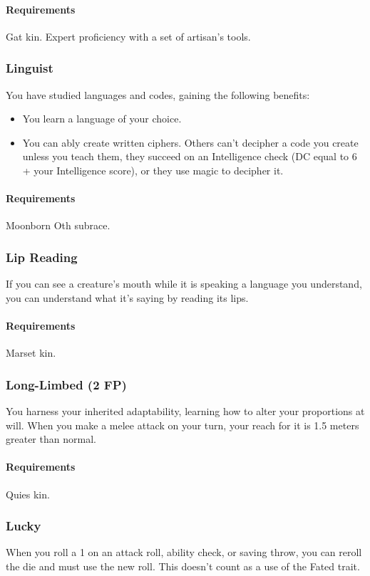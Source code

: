     \paragraph{Requirements} Gat kin. Expert proficiency with a set of artisan's tools.
\subsubsection{Linguist} \label{feat::linguist}
    You have studied languages and codes, gaining the following benefits:
    \begin{itemize}
        \item You learn a language of your choice.
        \item You can ably create written ciphers.
        Others can't decipher a code you create unless you teach them, they succeed on an Intelligence check (DC equal to 6 + your Intelligence score), or they use magic to decipher it. %
    \end{itemize}
    \paragraph{Requirements} Moonborn Oth subrace.
\subsubsection{Lip Reading} \label{feat::lipreading}
    If you can see a creature's mouth while it is speaking a language you understand, you can understand what it's saying by reading its lips.
    \paragraph{Requirements} Marset kin.
\subsubsection{Long-Limbed (2 FP)} \label{feat::longlimbed}
    You harness your inherited adaptability, learning how to alter your proportions at will.
    When you make a melee attack on your turn, your reach for it is 1.5 meters greater than normal.
    \paragraph{Requirements} Quies kin.
\subsubsection{Lucky} \label{feat::lucky}
    When you roll a 1 on an attack roll, ability check, or saving throw, you can reroll the die and must use the new roll.
    This doesn't count as a use of the Fated trait.
